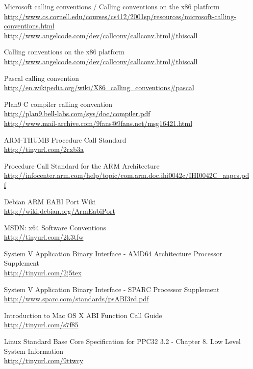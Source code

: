 \begin{thebibliography}{14}
	Microsoft calling conventions / Calling conventions on the x86 platform\\
	\url{http://www.cs.cornell.edu/courses/cs412/2001sp/resources/microsoft-calling-conventions.html}\\
	\url{http://www.angelcode.com/dev/callconv/callconv.html#thiscall}

	Calling conventions on the x86 platform\\
	\url{http://www.angelcode.com/dev/callconv/callconv.html#thiscall}

	Pascal calling convention\\
	\url{http://en.wikipedia.org/wiki/X86_calling_conventions#pascal}%

	Plan9 C compiler calling convention\\
	\url{http://plan9.bell-labs.com/sys/doc/compiler.pdf}\\
	\url{http://www.mail-archive.com/9fans@9fans.net/msg16421.html}

	ARM-THUMB Procedure Call Standard\\
	\url{http://tinyurl.com/2rxb3a}

        Procedure Call Standard for the ARM Architecture\\
        \url{http://infocenter.arm.com/help/topic/com.arm.doc.ihi0042c/IHI0042C_aapcs.pdf}

	Debian ARM EABI Port Wiki\\
	\url{http://wiki.debian.org/ArmEabiPort}

	MSDN: x64 Software Conventions\\
	\url{http://tinyurl.com/2k3tfw}

	System V Application Binary Interface - AMD64 Architecture Processor Supplement\\
	\url{http://tinyurl.com/2j5tex}

	System V Application Binary Interface - SPARC Processor Supplement\\
	\url{http://www.sparc.com/standards/psABI3rd.pdf}

	Introduction to Mac OS X ABI Function Call Guide\\
	\url{http://tinyurl.com/s7f85}

	Linux Standard Base Core Specification for PPC32 3.2 - Chapter 8. Low Level System Information\\
	\url{http://tinyurl.com/9ttwcy}


\end{thebibliography}
